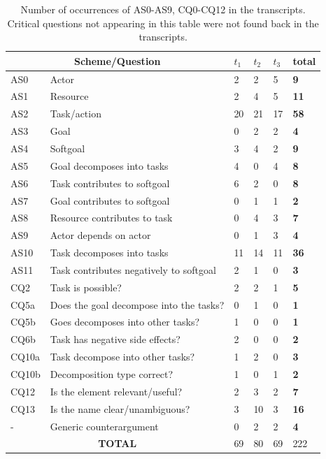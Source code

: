 \begin{table}[ht]
\centering
\begin{tabularx}{0.5\textwidth}{|l|X|l|l|l|>{\bfseries}l|}
\hline
\multicolumn{2}{|c|}{\textbf{Scheme/Question}} & $t_1$ & $t_2$ & $t_3$ & \textbf{total}\\
\hline 
AS0 & Actor & 2 & 2 & 5 & 9\\
\hline
AS1 & Resource & 2 & 4 & 5 & 11\\
\hline
AS2 & Task/action & 20 & 21 & 17 & 58\\
\hline
AS3 & Goal & 0 & 2 & 2 & 4\\
\hline
AS4 & Softgoal & 3 & 4 & 2 & 9\\
\hline
AS5 & Goal decomposes into tasks & 4 &0& 4 & 8\\
\hline
AS6 & Task contributes to softgoal & 6 & 2 &0& 8\\
\hline
AS7 & Goal contributes to softgoal &0& 1 & 1 & 2\\
\hline
AS8 & Resource contributes to task & 0 & 4 & 3 & 7\\
\hline
AS9 & Actor depends on actor &0& 1 & 3 & 4\\
\hline
AS10 & Task decomposes into tasks & 11 &14 &11 &36\\ 
\hline
AS11 & Task contributes negatively to softgoal & 2 & 1 & 0 & 3\\
\hline
\hline
CQ2 & Task is possible? & 2 & 2 & 1 & 5\\
\hline		
CQ5a & Does the goal decompose into the tasks? & 0 & 1 & 0 & 1\\
\hline
CQ5b & Goes decomposes into other tasks? & 1 & 0 & 0 & 1\\
\hline
CQ6b & Task has negative side effects? & 2 & 0 & 0 & 2\\
\hline
CQ10a & Task decompose into other tasks? & 1 &2 &0&3\\
\hline
CQ10b & Decomposition type correct? &1 &0& 1 &2\\
\hline
\hline
CQ12 & Is the element relevant/useful? & 2 & 3 & 2 &7\\
\hline
CQ13 & Is the name clear/unambiguous? &3 &10 & 3 & 16\\
\hline
\hline
- & Generic counterargument & 0& 2 & 2 & 4\\
\hline
\hline
\multicolumn{2}{|c|}{\textbf{TOTAL}}&69&80&69&222\\
\hline
\end{tabularx}
\caption{Number of occurrences of AS0-AS9, CQ0-CQ12 in the transcripts. Critical questions not appearing in this table were not found back in the transcripts.}
\label{table:transcripts:results:argumentschemes}
\end{table}

